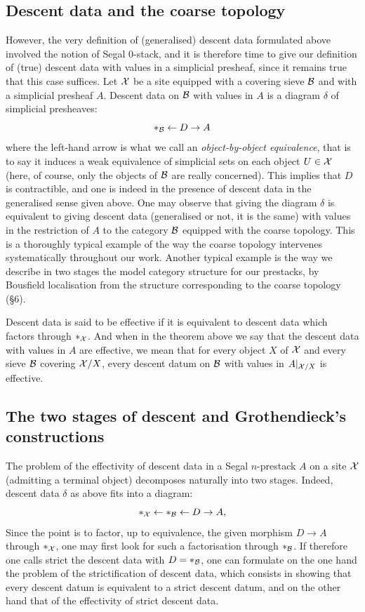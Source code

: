 \subsection*{Descent data and the coarse topology}

However, the very definition of (generalised) descent data formulated above
involved the notion of Segal $0$-stack, and it is therefore time to give our
definition of (true) descent data with values in a simplicial presheaf, since
it remains true that this case suffices. Let ${\cal X}$ be a site equipped with a
covering sieve ${\cal B}$ and with a simplicial presheaf $A$. Descent data on
${\cal B}$ with values in $A$ is a diagram $\delta$ of simplicial presheaves:
$$
*_{{\cal B}} \leftarrow D \rightarrow A
$$
where the left-hand arrow is what we call an \emph{object-by-object
equivalence}, that is to say it induces a weak equivalence of simplicial sets
on each object $U \in {\cal X}$ (here, of course, only the objects of ${\cal B}$ are
really concerned). This implies that $D$ is contractible, and one is indeed
in the presence of descent data in the generalised sense given above. One may
observe that giving the diagram $\delta$ is equivalent to giving descent data
(generalised or not, it is the same) with values in the restriction of $A$ to
the category ${\cal B}$ equipped with the coarse topology. This is a thoroughly
typical example of the way the coarse topology intervenes systematically
throughout our work. Another typical example is the way we describe in two
stages the model category structure for our prestacks, by Bousfield
localisation from the structure corresponding to the coarse topology (\S6).

Descent data is said to be effective if it is equivalent to descent data
which factors through $*_{{\cal X}}$. And when in the theorem above we say that
the descent data with values in $A$ are effective, we mean that for every
object $X$ of ${\cal X}$ and every sieve ${\cal B}$ covering ${\cal X}/X$, every descent
datum on ${\cal B}$ with values in $A|_{{\cal X}/X}$ is effective.

\subsection*{The two stages of descent and Grothendieck's constructions}

The problem of the effectivity of descent data in a Segal $n$-prestack $A$ on
a site ${\cal X}$ (admitting a terminal object) decomposes naturally into two
stages. Indeed, descent data $\delta$ as above fits into a diagram:
$$
*_{{\cal X}} \leftarrow *_{{\cal B}} \leftarrow D \rightarrow A,
$$
Since the point is to factor, up to equivalence, the given morphism
$D \rightarrow A$ through $*_{{\cal X}}$, one may first look for such a
factorisation through $*_{{\cal B}}$. If therefore one calls strict the descent
data with $D=*_{{\cal B}}$, one can formulate on the one hand the problem of the
strictification of descent data, which consists in showing that every descent
datum is equivalent to a strict descent datum, and on the other hand that of
the effectivity of strict descent data.

